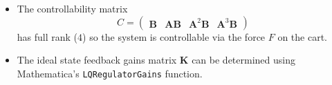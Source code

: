\documentclass{article}
\renewcommand{\vec}[1]{\boldsymbol{\mathbf{#1}}}
\begin{document}
\begin{itemize}
  \item The controllability matrix \[C = \begin{pmatrix}
            \vec{B} & \vec{A} \vec{B} & \vec{A}^2 \vec{B} & \vec{A}^3 \vec{B}
          \end{pmatrix}\] has full rank ($4$) so the system is controllable via the force $F$ on the cart.

  \item The ideal state feedback gains matrix $\vec{K}$ can be determined using Mathematica's \texttt{LQRegulatorGains} function.
\end{itemize}
\end{document}
